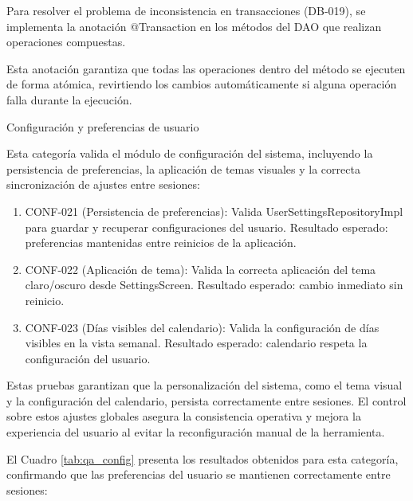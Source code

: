   Para resolver el problema de inconsistencia en transacciones (DB-019), se implementa la anotación @Transaction en los métodos del DAO que realizan operaciones compuestas.
  
  Esta anotación garantiza que todas las operaciones dentro del método se ejecuten de forma atómica, revirtiendo los cambios automáticamente si alguna operación falla durante la ejecución.
  
  \item Configuración y preferencias de usuario
  
  Esta categoría valida el módulo de configuración del sistema, incluyendo la persistencia de preferencias, la aplicación de temas visuales y la correcta sincronización de ajustes entre sesiones:
  
  \begin{enumerate}[label=\alph*)]
    \item CONF-021 (Persistencia de preferencias): Valida UserSettingsRepositoryImpl para guardar y recuperar configuraciones del usuario. Resultado esperado: preferencias mantenidas entre reinicios de la aplicación.
    
    \item CONF-022 (Aplicación de tema): Valida la correcta aplicación del tema claro/oscuro desde SettingsScreen. Resultado esperado: cambio inmediato sin reinicio.
    
    \item CONF-023 (Días visibles del calendario): Valida la configuración de días visibles en la vista semanal. Resultado esperado: calendario respeta la configuración del usuario.
  \end{enumerate}
  
  Estas pruebas garantizan que la personalización del sistema, como el tema visual y la configuración del calendario, persista correctamente entre sesiones. El control sobre estos ajustes globales asegura la consistencia operativa y mejora la experiencia del usuario al evitar la reconfiguración manual de la herramienta.
  
  
  El Cuadro \ref{tab:qa_config} presenta los resultados obtenidos para esta categoría, confirmando que las preferencias del usuario se mantienen correctamente entre sesiones:
  

